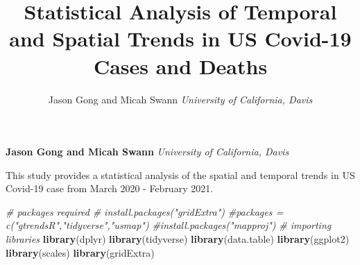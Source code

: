 \documentclass[11pt,]{article}
\title{Statistical Analysis of Temporal and Spatial Trends in US Covid-19 Cases
and Deaths  }
\author{\Large Jason Gong and Micah Swann\vspace{0.05in} \newline\normalsize\emph{University of California, Davis}  }
\date{}
\newcommand*{\authorfont}{\fontfamily{phv}\selectfont}
\renewenvironment{abstract}
 {{%
    \setlength{\leftmargin}{0mm}
    \setlength{\rightmargin}{\leftmargin}%
  }%
  \relax}
 {\endlist}
\newenvironment{Shaded}{\begin{snugshade}}{\end{snugshade}}
\newcommand{\CommentTok}[1]{\textcolor[rgb]{0.56,0.35,0.01}{\textit{#1}}}
\newcommand{\KeywordTok}[1]{\textcolor[rgb]{0.13,0.29,0.53}{\textbf{#1}}}
\newcommand{\NormalTok}[1]{#1}
\begin{document}
	
%

{%
\setlength{\parindent}{0pt}
\thispagestyle{plain}
{\fontsize{18}{20}\selectfont\raggedright 
\maketitle  %

}

{
   \vskip 13.5pt\relax \normalsize\fontsize{11}{12} 
\textbf{\authorfont Jason Gong and Micah Swann} \hskip 15pt \emph{\small University of California, Davis}   

}

}








\begin{abstract}

    \hbox{\vrule height .2pt width 39.14pc}

    \vskip 8.5pt %

\noindent This study provides a statistical analysis of the spatial and temporal
trends in US Covid-19 case from March 2020 - February 2021.


    \hbox{\vrule height .2pt width 39.14pc}


\end{abstract}


\vskip -8.5pt



\noindent  

\begin{Shaded}
\begin{Highlighting}[]
\CommentTok{# packages required}
\CommentTok{# install.packages("gridExtra")}
\CommentTok{#packages = c("gtrendsR","tidyverse","usmap")}
\CommentTok{#install.packages("mapproj")}
\CommentTok{# importing libraries}
 \KeywordTok{library}\NormalTok{(dplyr)}
 \KeywordTok{library}\NormalTok{(tidyverse)}
 \KeywordTok{library}\NormalTok{(data.table)}
 \KeywordTok{library}\NormalTok{(ggplot2)  }
 \KeywordTok{library}\NormalTok{(scales)}
 \KeywordTok{library}\NormalTok{(gridExtra)}
\end{Highlighting}
\end{Shaded}
\end{document}
